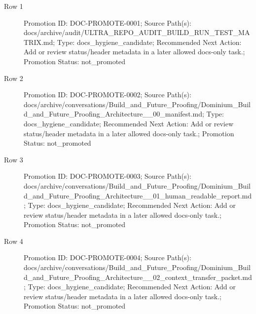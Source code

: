 \documentclass[10.5pt,a4paper,openany]{book}
\begin{document}
\begin{description}
\item[Row 1] Promotion ID: DOC-\allowbreak{}PROMOTE-\allowbreak{}0001; Source Path(s): docs/\allowbreak{}archive/\allowbreak{}audit/\allowbreak{}ULTRA\_\allowbreak{}REPO\_\allowbreak{}AUDIT\_\allowbreak{}BUILD\_\allowbreak{}RUN\_\allowbreak{}TEST\_\allowbreak{}MATRIX.\allowbreak{}md; Type: docs\_\allowbreak{}hygiene\_\allowbreak{}candidate; Recommended Next Action: Add or review status/\allowbreak{}header metadata in a later allowed docs-\allowbreak{}only task.\allowbreak{}; Promotion Status: not\_\allowbreak{}promoted
\item[Row 2] Promotion ID: DOC-\allowbreak{}PROMOTE-\allowbreak{}0002; Source Path(s): docs/\allowbreak{}archive/\allowbreak{}conversations/\allowbreak{}Build\_\allowbreak{}and\_\allowbreak{}Future\_\allowbreak{}Proofing/\allowbreak{}Dominium\_\allowbreak{}Build\_\allowbreak{}and\_\allowbreak{}Future\_\allowbreak{}Proofing\_\allowbreak{}Architecture\_\allowbreak{}\_\allowbreak{}00\_\allowbreak{}manifest.\allowbreak{}md; Type: docs\_\allowbreak{}hygiene\_\allowbreak{}candidate; Recommended Next Action: Add or review status/\allowbreak{}header metadata in a later allowed docs-\allowbreak{}only task.\allowbreak{}; Promotion Status: not\_\allowbreak{}promoted
\item[Row 3] Promotion ID: DOC-\allowbreak{}PROMOTE-\allowbreak{}0003; Source Path(s): docs/\allowbreak{}archive/\allowbreak{}conversations/\allowbreak{}Build\_\allowbreak{}and\_\allowbreak{}Future\_\allowbreak{}Proofing/\allowbreak{}Dominium\_\allowbreak{}Build\_\allowbreak{}and\_\allowbreak{}Future\_\allowbreak{}Proofing\_\allowbreak{}Architecture\_\allowbreak{}\_\allowbreak{}01\_\allowbreak{}human\_\allowbreak{}readable\_\allowbreak{}report.\allowbreak{}md; Type: docs\_\allowbreak{}hygiene\_\allowbreak{}candidate; Recommended Next Action: Add or review status/\allowbreak{}header metadata in a later allowed docs-\allowbreak{}only task.\allowbreak{}; Promotion Status: not\_\allowbreak{}promoted
\item[Row 4] Promotion ID: DOC-\allowbreak{}PROMOTE-\allowbreak{}0004; Source Path(s): docs/\allowbreak{}archive/\allowbreak{}conversations/\allowbreak{}Build\_\allowbreak{}and\_\allowbreak{}Future\_\allowbreak{}Proofing/\allowbreak{}Dominium\_\allowbreak{}Build\_\allowbreak{}and\_\allowbreak{}Future\_\allowbreak{}Proofing\_\allowbreak{}Architecture\_\allowbreak{}\_\allowbreak{}02\_\allowbreak{}context\_\allowbreak{}transfer\_\allowbreak{}packet.\allowbreak{}md; Type: docs\_\allowbreak{}hygiene\_\allowbreak{}candidate; Recommended Next Action: Add or review status/\allowbreak{}header metadata in a later allowed docs-\allowbreak{}only task.\allowbreak{}; Promotion Status: not\_\allowbreak{}promoted

\end{description}
\end{document}
